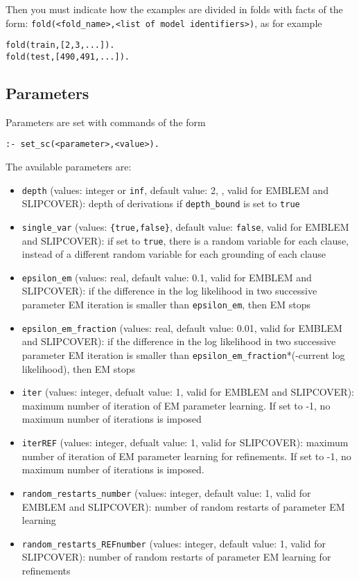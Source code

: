 \documentclass[a4paper,10pt]{article}
\begin{document}
Then you must indicate how the examples are divided in folds with facts of the form:
\verb|fold(<fold_name>,<list of model identifiers>)|, as for example
\begin{verbatim}
fold(train,[2,3,...]).
fold(test,[490,491,...]).
\end{verbatim}
\subsection{Parameters}
Parameters are set with  commands of the form
\begin{verbatim}
:- set_sc(<parameter>,<value>).
\end{verbatim}
The available parameters are:
\begin{itemize}
\item \verb|depth| (values: integer or \verb|inf|, default value: 2, , valid for EMBLEM and SLIPCOVER): depth of derivations if  \verb|depth_bound|  is set to \verb|true|
\item \verb|single_var| (values: \verb|{true,false}|, default value: \verb|false|, valid for EMBLEM and SLIPCOVER): if set to \verb|true|, there is a random variable for each clause, instead of a different random variable for each grounding of each clause
\item \verb|epsilon_em| (values: real, default value: 0.1, valid for 
EMBLEM and SLIPCOVER): if the difference in the log likelihood in two successive parameter EM iteration is smaller
than \verb|epsilon_em|, then EM stops 
\item \verb|epsilon_em_fraction| (values: real, default value: 0.01, valid for 
EMBLEM and SLIPCOVER): if the difference in the log likelihood in two successive parameter EM iteration is smaller
than \verb|epsilon_em_fraction|*(-current log likelihood), then EM stops
\item \verb|iter| (values: integer, defualt value: 1, valid for EMBLEM and SLIPCOVER): maximum number of iteration of EM parameter learning. If set to -1, no maximum number of iterations is imposed
\item \verb|iterREF| (values: integer, defualt value: 1, valid for  
 SLIPCOVER):
 maximum number of iteration of EM parameter learning for refinements. If set to -1, no maximum number of iterations is imposed.
\item \verb|random_restarts_number| (values: integer, default value: 1, valid for EMBLEM and SLIPCOVER): number of random restarts of parameter EM learning
\item \verb|random_restarts_REFnumber| (values: integer, default value: 1, valid for  SLIPCOVER): number of random restarts of parameter EM learning for refinements

\end{itemize}
\end{document}
